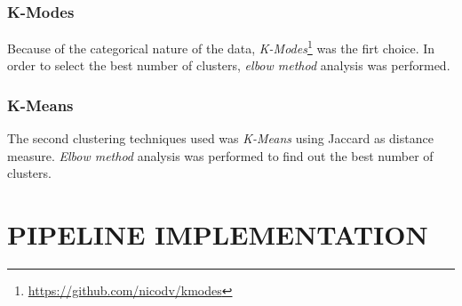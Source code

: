 \documentclass{article}
\begin{document}
\subsubsection{K-Modes}
Because of the categorical nature of the data, \emph{K-Modes}\footnote{\url{https://github.com/nicodv/kmodes}} was the firt choice. In order to select the best number of clusters, \emph{elbow method} analysis was performed.

\subsubsection{K-Means}
The second clustering techniques used was \emph{K-Means} using Jaccard as distance measure. \emph{Elbow method} analysis was performed to find out the best number of clusters.

\newpage
\section{PIPELINE IMPLEMENTATION}
\end{document}

